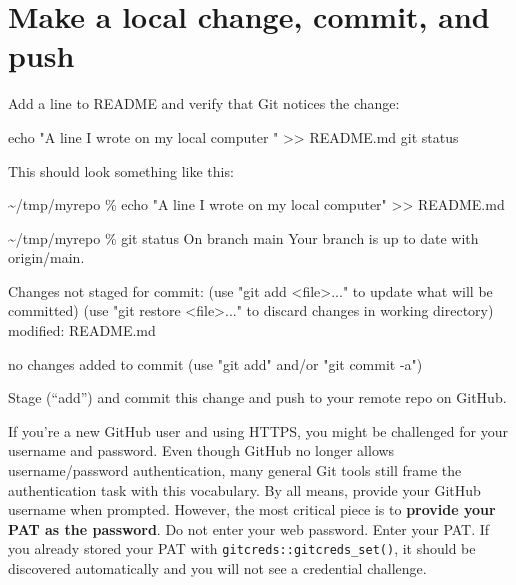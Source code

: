 \documentclass[
]{book}
\newenvironment{Shaded}{\begin{snugshade}}{\end{snugshade}}
\newcommand{\NormalTok}[1]{#1}
\begin{document}
\section{Make a local change, commit, and push}\label{make-a-local-change-commit-and-push}

Add a line to README and verify that Git notices the change:

\begin{Shaded}
\begin{Highlighting}[]
\NormalTok{echo "A line I wrote on my local computer  " \textgreater{}\textgreater{} README.md}
\NormalTok{git status}
\end{Highlighting}
\end{Shaded}

This should look something like this:

\begin{Shaded}
\begin{Highlighting}[]
\NormalTok{\textasciitilde{}/tmp/myrepo \% echo "A line I wrote on my local computer" \textgreater{}\textgreater{} README.md}

\NormalTok{\textasciitilde{}/tmp/myrepo \% git status}
\NormalTok{On branch main}
\NormalTok{Your branch is up to date with \textquotesingle{}origin/main\textquotesingle{}.}

\NormalTok{Changes not staged for commit:}
\NormalTok{  (use "git add \textless{}file\textgreater{}..." to update what will be committed)}
\NormalTok{  (use "git restore \textless{}file\textgreater{}..." to discard changes in working directory)}
\NormalTok{        modified:   README.md}

\NormalTok{no changes added to commit (use "git add" and/or "git commit {-}a")}
\end{Highlighting}
\end{Shaded}

Stage (``add'') and commit this change and push to your remote repo on GitHub.

If you're a new GitHub user and using HTTPS, you might be challenged for your username and password.
Even though GitHub no longer allows username/password authentication, many general Git tools still frame the authentication task with this vocabulary.
By all means, provide your GitHub username when prompted.
However, the most critical piece is to \textbf{provide your PAT as the password}.
Do not enter your web password.
Enter your PAT.
If you already stored your PAT with \texttt{gitcreds::gitcreds\_set()}, it should be discovered automatically and you will not see a credential challenge.
\end{document}
